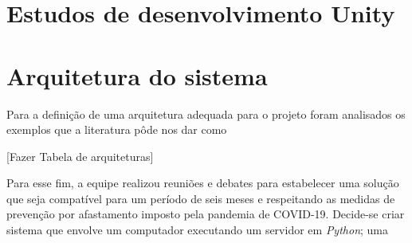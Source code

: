 

\section{Estudos de desenvolvimento Unity}

\section{Arquitetura do sistema}

Para a definição de uma arquitetura adequada para o projeto foram analisados os exemplos que a literatura pôde nos dar como

[Fazer Tabela de arquiteturas]

Para esse fim, a equipe realizou reuniões e debates para estabelecer uma solução que seja compatível para um período de seis meses e respeitando as medidas de prevenção por afastamento imposto pela pandemia de COVID-19. Decide-se criar sistema que envolve um computador executando um servidor em \textit{Python}; uma 

